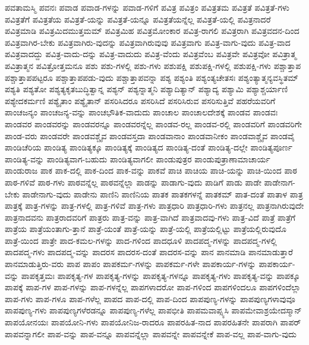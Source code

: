 {ಪವತಾಮಸ್ಮಿ
ಪವನಃ
ಪವಾಡ
ಪವಾಡ-ಗಳನ್ನು
ಪವಾಡ-ಗಳಿಗೆ
ಪವಿತ್ರ
ಪವಿತ್ರಂ
ಪವಿತ್ರತಮ
ಪವಿತ್ರತೆ
ಪವಿತ್ರತೆ-ಗಳು
ಪವಿತ್ರತೆಗೆ
ಪವಿತ್ರತೆಯ
ಪವಿತ್ರತೆ-ಯನ್ನು
ಪವಿತ್ರತೆ-ಯನ್ನೂ
ಪವಿತ್ರತೆಯನ್ನೆಲ್ಲ
ಪವಿತ್ರತೆ-ಯಲ್ಲಿ
ಪವಿತ್ರನಾದರೆ
ಪವಿತ್ರಮಾಡಿ
ಪವಿತ್ರಮಿದಮುತ್ತಮಮ್
ಪವಿತ್ರಮಿಹ
ಪವಿತ್ರಮೋಂಕಾರ
ಪವಿತ್ರ-ರಾಗಲಿ
ಪವಿತ್ರರಾಗಿ
ಪವಿತ್ರವದನ-ದಿಂದ
ಪವಿತ್ರವಾಗಿರ-ಬೇಕು
ಪವಿತ್ರವಾಗಿರು-ವುದನ್ನು
ಪವಿತ್ರವಾಗಿರುವುವು
ಪವಿತ್ರವಾಗು
ಪವಿತ್ರ-ವಾಗು-ವುದು
ಪವಿತ್ರ-ವಾದ
ಪವಿತ್ರವಾದದ್ದು
ಪವಿತ್ರ-ವಾದು-ದನ್ನು
ಪವಿತ್ರ-ವಾದುದು
ಪವಿತ್ರ-ವೆಂದು
ಪವಿತ್ರವೆಂಬ
ಪವಿತ್ರವೇ
ಪವಿತ್ರವೋ
ಪವಿತ್ರಾತ್ಮ
ಪವಿತ್ರಾತ್ಮನ
ಪವಿತ್ರೋತ್ತಮನೂ
ಪಶು
ಪಶು-ಗಳಲ್ಲಿ
ಪಶು-ಗಳು
ಪಶುಪಕ್ಷಿ
ಪಶುಪಕ್ಷಿ-ಗಳಲ್ಲಿ
ಪಶುಪಕ್ಷಿ-ಗಳು
ಪಶ್ಚಾತ್ತಾಪ
ಪಶ್ಚಾತ್ತಾಪಪಟ್ಟರೂ
ಪಶ್ಚಾತ್ತಾಪಪಡು-ವುದು
ಪಶ್ಚಾತ್ತಾಪವನ್ನಾ
ಪಶ್ಯ
ಪಶ್ಯಂತಿ
ಪಶ್ಯಂತ್ಯಚೇತಸಃ
ಪಶ್ಯಂತ್ಯಾತ್ಮನ್ಯವಸ್ಥಿತಮ್
ಪಶ್ಯತಿ
ಪಶ್ಯತೋ
ಪಶ್ಯತ್ಯಕೃತಬುದ್ಧಿತ್ವಾನ್ನ
ಪಶ್ಯನ್
ಪಶ್ಯನ್ನಾತ್ಮನಿ
ಪಶ್ಯಾದಿತ್ಯಾನ್
ಪಶ್ಯಾದ್ಯ
ಪಶ್ಯಾಮಿ
ಪಶ್ಯಾಶ್ಚರ್ಯಾಣಿ
ಪಶ್ಯೇದಕರ್ಮಣಿ
ಪಶ್ಯೈತಾಂ
ಪಶ್ಯೈತಾನ್
ಪಸರಿಸಿದರೂ
ಪಸರಿಸಿದೆ
ಪಸರಿಸಿರುವ
ಪಸರಿಸುತ್ತಿವೆ
ಪಹರೆಯವರಿಗೆ
ಪಾಂಚಜನ್ಯಂ
ಪಾಂಚಜನ್ಯ-ವನ್ನು
ಪಾಂಚಭೌತಿಕ-ವಾದುದು
ಪಾಂಚಾಲ
ಪಾಂಚಾಲದೇಶಕ್ಕೆ
ಪಾಂಡವ
ಪಾಂಡವಃ
ಪಾಂಡವರ
ಪಾಂಡವರನ್ನು
ಪಾಂಡವರನ್ನೂ
ಪಾಂಡವರನ್ನೆಲ್ಲ
ಪಾಂಡವ-ರಲ್ಲ
ಪಾಂಡವ-ರಲ್ಲಿ
ಪಾಂಡವರಿಗೆ
ಪಾಂಡವರಿಗೇ
ಪಾಂಡ-ವರು
ಪಾಂಡವರೇ
ಪಾಂಡವಶ್ಚೈವ
ಪಾಂಡವಸ್ತದಾ
ಪಾಂಡವಾನಾಂ
ಪಾಂಡವಾನೀಕಂ
ಪಾಂಡವಾಶ್ಚೈವ
ಪಾಂಡವೈ
ಪಾಂಡಿಚೆರಿಯ
ಪಾಂಡಿತ್ಯ
ಪಾಂಡಿತ್ಯಕ್ಕೂ
ಪಾಂಡಿತ್ಯಕ್ಕೆ
ಪಾಂಡಿತ್ಯದ
ಪಾಂಡಿತ್ಯ-ದಂತೆ
ಪಾಂಡಿತ್ಯ-ದಲ್ಲೇ
ಪಾಂಡಿತ್ಯಪೂರ್ಣ
ಪಾಂಡಿತ್ಯ-ವನ್ನು
ಪಾಂಡಿತ್ಯವಾಗ-ಬಹುದು
ಪಾಂಡಿತ್ಯವಾಗಲೀ
ಪಾಂಡುಪುತ್ರರ
ಪಾಂಡುಪುತ್ರಾಣಾಮಾಚಾರ್ಯ
ಪಾಂಡುರಾಜ
ಪಾಕ
ಪಾಕ-ದಲ್ಲಿ
ಪಾಕ-ದಿಂದ
ಪಾಕ-ವನ್ನು
ಪಾಕವೆ
ಪಾಚಿ
ಪಾಚಿಯ
ಪಾಚಿ-ಯನ್ನು
ಪಾಚಿ-ಯಿಂದ
ಪಾಠ
ಪಾಠ-ಗಳಿವೆ
ಪಾಠ-ಗಳು
ಪಾಠವನ್ನೆಲ್ಲ
ಪಾಠವನ್ನೆಲ್ಲಾ
ಪಾಡನ್ನು
ಪಾಡಾಗು-ವುದು
ಪಾಡಿಗೆ
ಪಾಡು
ಪಾಡೇ
ಪಾಡೇನಾಗ-ಬೇಕು
ಪಾಡೇನಾಗು-ವುದು
ಪಾಡೇನು
ಪಾಣಿನಿ
ಪಾಣಿನಿಯ
ಪಾತಕ
ಪಾತಕಗಳನ್ನೆ
ಪಾತಕಮ್
ಪಾತ-ದಂತೆ
ಪಾತಾಳ
ಪಾತ್ರ
ಪಾತ್ರಕ್ಕೆ
ಪಾತ್ರ-ಗಳನ್ನು
ಪಾತ್ರ-ಗಳಲ್ಲಿ
ಪಾತ್ರ-ಗಳಿವೆ
ಪಾತ್ರ-ಗಳು
ಪಾತ್ರಧಾರಿ
ಪಾತ್ರಧಾರಿ-ಗಳು
ಪಾತ್ರನಲ್ಲ
ಪಾತ್ರನಾಗಿರುವುದೇ
ಪಾತ್ರನಾದವನು
ಪಾತ್ರರಾದವರಿಗೆ
ಪಾತ್ರರು
ಪಾತ್ರ-ವನ್ನು
ಪಾತ್ರ-ವಾಗಿದೆ
ಪಾತ್ರವಾದವು-ಗಳು
ಪಾತ್ರ-ವಿದೆ
ಪಾತ್ರೆ
ಪಾತ್ರೆಗೆ
ಪಾತ್ರೆಯ
ಪಾತ್ರೆಯಂತಾಗು-ತ್ತಾನೆ
ಪಾತ್ರೆ-ಯಂತೆ
ಪಾತ್ರೆ-ಯನ್ನು
ಪಾತ್ರೆ-ಯಲ್ಲಿ
ಪಾತ್ರೆಯಲ್ಲಿಟ್ಟು
ಪಾತ್ರೆಯಲ್ಲಿರುವುದೊ
ಪಾತ್ರೆ-ಯಿಂದ
ಪಾತ್ರೇ
ಪಾದ-ಕಮಲ-ಗಳನ್ನು
ಪಾದ-ಗಳಿಂದ
ಪಾದಧೂಳಿ
ಪಾದಪದ್ಮ-ಗಳನ್ನು
ಪಾದಪದ್ಮ-ಗಳಲ್ಲಿ
ಪಾದಪದ್ಮ-ಗಳು
ಪಾದಪದ್ಮ-ವನ್ನು
ಪಾದರಸ
ಪಾದರಸ-ದಂತೆ
ಪಾದರಸ-ವನ್ನು
ಪಾನ
ಪಾನಮಾಡಿ
ಪಾನಮಾಡುತ್ತಾರೆ
ಪಾನಮಾಡುತ್ತಿರು-ವರು
ಪಾಪ
ಪಾಪಂ
ಪಾಪಕರ್ಮ-ಗಳನ್ನು
ಪಾಪಕರ್ಮ-ಗಳೇ
ಪಾಪಕಾರ್ಯ-ಗಳನ್ನು
ಪಾಪಕಾರ್ಯ-ವನ್ನು
ಪಾಪಕೃತ್ತಮಃ
ಪಾಪಕೃತ್ಯ-ಗಳ
ಪಾಪಕೃತ್ಯ-ಗಳನ್ನು
ಪಾಪಕೃತ್ಯ-ಗಳನ್ನೂ
ಪಾಪಕೃತ್ಯ-ಗಳು
ಪಾಪಕೃತ್ಯ-ವನ್ನು
ಪಾಪಕ್ಕೂ
ಪಾಪಕ್ಕೆ
ಪಾಪ-ಗಳ
ಪಾಪ-ಗಳನ್ನು
ಪಾಪ-ಗಳನ್ನೆಲ್ಲ
ಪಾಪಗಳಾದರೋ
ಪಾಪ-ಗಳಿಂದ
ಪಾಪಗಳಿಂದಲೂ
ಪಾಪಗಳಿಂದೆಲ್ಲಾ
ಪಾಪ-ಗಳು
ಪಾಪ-ಗಳೂ
ಪಾಪ-ಗಳೆಲ್ಲ
ಪಾಪದ
ಪಾಪ-ದಲ್ಲಿ
ಪಾಪ-ದಿಂದ
ಪಾಪಪುಣ್ಯ-ಗಳನ್ನು
ಪಾಪಪುಣ್ಯಗಳಾವುವೂ
ಪಾಪಪುಣ್ಯ-ಗಳು
ಪಾಪಪುಣ್ಯಗಳೆರಡನ್ನೂ
ಪಾಪಪುಣ್ಯ-ಗಳೆಲ್ಲ
ಪಾಪಭೀತಿ
ಪಾಪಮವಾಪ್ಸ್ಯಸಿ
ಪಾಪಮೇವಾಶ್ರಯೇದಸ್ಮಾನ್
ಪಾಪಯೋನಯಃ
ಪಾಪಯೋನಿ-ಗಳು
ಪಾಪಯೋನಿಜ-ರಾದರೂ
ಪಾಪರಹಿತ-ನಾದ
ಪಾಪರಹಿತನೇ
ಪಾಪರಾಗಿ
ಪಾಪರ್
ಪಾಪವನ್ನಾಗಲೀ
ಪಾಪ-ವನ್ನು
ಪಾಪ-ವನ್ನೂ
ಪಾಪವನ್ನೆಲ್ಲಾ
ಪಾಪವನ್ನೇ
ಪಾಪವನ್ನೇಕೆ
ಪಾಪ-ವಲ್ಲ
ಪಾಪ-ವಾಗು-ವುದು
}
